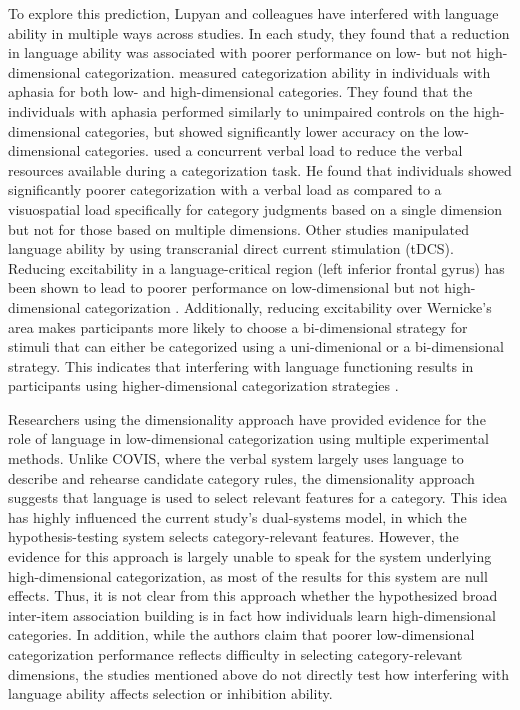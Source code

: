 \documentclass[../dissertation.tex]{subfiles}
\begin{document}
	To explore this prediction, Lupyan and colleagues have interfered with language ability in multiple ways across studies. In each study, they found that a reduction in language ability was associated with poorer performance on low- but not high-dimensional categorization. \citet{Lupyan2013} measured categorization ability in individuals with aphasia for both low- and high-dimensional categories. They found that the individuals with aphasia performed similarly to unimpaired controls on the high-dimensional categories, but showed significantly lower accuracy on the low-dimensional categories. \citet{Lupyan2009} used a concurrent verbal load to reduce the verbal resources available during a categorization task. He found that individuals showed significantly poorer categorization with a verbal load as compared to a visuospatial load specifically for category judgments based on a single dimension but not for those based on multiple dimensions. Other studies manipulated language ability by using transcranial direct current stimulation (tDCS). Reducing excitability in a language-critical region (left inferior frontal gyrus) has been shown to lead to poorer performance on low-dimensional but not high-dimensional categorization \citep{Lupyan2012b}. Additionally, reducing excitability over Wernicke's area makes participants more likely to choose a bi-dimensional strategy for stimuli that can either be categorized using a uni-dimenional or a bi-dimensional strategy. This indicates that interfering with language functioning results in participants using higher-dimensional categorization strategies \citep{Perry2014}. \par 
	Researchers using the dimensionality approach have provided evidence for the role of language in low-dimensional categorization using multiple experimental methods. Unlike COVIS, where the verbal system largely uses language to describe and rehearse candidate category rules, the dimensionality approach suggests that language is used to select relevant features for a category. This idea has highly influenced the current study's dual-systems model, in which the hypothesis-testing system selects category-relevant features. However, the evidence for this approach is largely unable to speak for the system underlying high-dimensional categorization, as most of the results for this system are null effects. Thus, it is not clear from this approach whether the hypothesized broad inter-item association building is in fact how individuals learn high-dimensional categories. In addition, while the authors claim that poorer low-dimensional categorization performance reflects difficulty in selecting category-relevant dimensions, the studies mentioned above do not directly test how interfering with language ability affects selection or inhibition ability.
	
\end{document}
